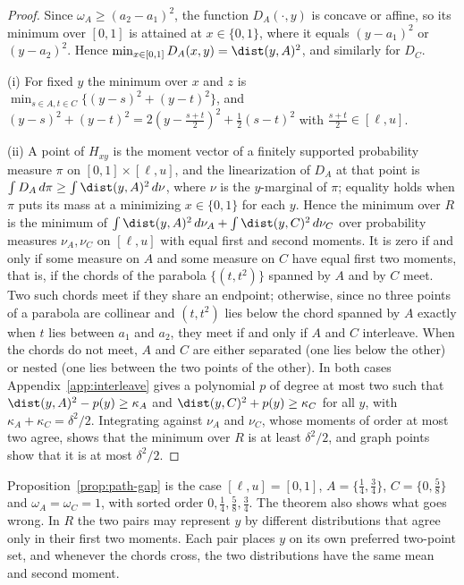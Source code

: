 \begin{proof}
Since $\omega_A\ge(a_2-a_1)^2$, the function $D_A(\cdot,y)$ is concave or
affine, so its minimum over $[0,1]$ is attained at $x\in\{0,1\}$, where it
equals $(y-a_1)^2$ or $(y-a_2)^2$. Hence
$\min_{x\in[0,1]}D_A(x,y)=\dist(y,A)^2$, and similarly for $D_C$.

(i) For fixed $y$ the minimum over $x$ and $z$ is
$\min_{s\in A,t\in C}\{(y-s)^2+(y-t)^2\}$, and
$(y-s)^2+(y-t)^2=2(y-\tfrac{s+t}2)^2+\tfrac12(s-t)^2$ with
$\tfrac{s+t}2\in[\ell,u]$.

(ii) A point of $H_{xy}$ is the moment vector of a finitely supported
probability measure $\pi$ on $[0,1]\times[\ell,u]$, and the linearization
of $D_A$ at that point is $\int D_A\,d\pi\ge\int\dist(y,A)^2\,d\nu$, where
$\nu$ is the $y$-marginal of $\pi$; equality holds when $\pi$ puts its mass
at a minimizing $x\in\{0,1\}$ for each $y$. Hence the minimum over $R$ is
the minimum of $\int\dist(y,A)^2\,d\nu_A+\int\dist(y,C)^2\,d\nu_C$ over
probability measures $\nu_A,\nu_C$ on $[\ell,u]$ with equal first and
second moments. It is zero if and only if some measure on $A$ and some
measure on $C$ have equal first two moments, that is, if the chords of the
parabola $\{(t,t^2)\}$ spanned by $A$ and by $C$ meet. Two such chords meet
if they share an endpoint; otherwise, since no three points of a parabola
are collinear and $(t,t^2)$ lies below the chord spanned by $A$ exactly
when $t$ lies between $a_1$ and $a_2$, they meet if and only if $A$ and $C$
interleave. When the chords do not meet, $A$ and $C$ are either separated
(one lies below the other) or nested (one lies between the two points of
the other). In both cases Appendix~\ref{app:interleave} gives a polynomial
$p$ of degree at most two such that $\dist(y,A)^2-p(y)\ge\kappa_A$ and
$\dist(y,C)^2+p(y)\ge\kappa_C$ for all $y$, with $\kappa_A+\kappa_C=\delta^2/2$.
Integrating against $\nu_A$ and $\nu_C$, whose moments of order at most
two agree, shows that the minimum over $R$ is at least $\delta^2/2$, and
graph points show that it is at most $\delta^2/2$.
\end{proof}



Proposition~\ref{prop:path-gap} is the case $[\ell,u]=[0,1]$,
$A=\{\tfrac14,\tfrac34\}$, $C=\{0,\tfrac58\}$ and $\omega_A=\omega_C=1$,
with sorted order $0,\tfrac14,\tfrac58,\tfrac34$. The theorem also shows
what goes wrong. In $R$ the two pairs may represent $y$ by different
distributions that agree only in their first two moments. Each pair
places $y$ on its own preferred two-point set, and whenever the chords
cross, the two distributions have the same mean and second moment.

